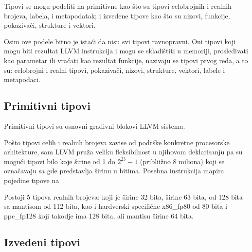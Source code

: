 Tipovi se mogu podeliti na primitivne kao što su tipovi celobrojnih i realnih brojeva, labela, i metapodatak; 
i izvedene tipove kao što su nizovi, funkcije, pokazivači, strukture i vektori.

Osim ove podele bitno je istaći da nisu svi tipovi ravnopravni.
Oni tipovi koji mogu biti rezultat LLVM instrukcija i mogu se skladištiti u memoriji, prosleđivati kao parametar ili vraćati kao rezultat funkcije, nazivaju se tipovi prvog reda, a to su: celobrojni i realni tipovi, pokazivači, nizovi, strukture, vektori, labele i metapodaci.


\subsection*{Primitivni tipovi}

Primitivni tipovi su osnovni gradivni blokovi LLVM sistema.

Pošto tipovi celih i realnih brojeva zavise od podrške konkretne procesorske arhitekture,
sam LLVM pruža veliku fleksibilnost u njihovom deklarisanju
pa su mogući tipovi bilo koje širine od 1 do $2^{23} - 1$ (pribliižno 8 miliona) koji se označavaju sa  gde  predstavlja širinu u bitima. Posebna instrukcija mapira pojedine tipove na 

Postoji 5 tipova realnih brojeva: 
 koji je širine 32 bita, 
 širine 63 bita, 
 od 128 bita sa mantisom od 112 bita, 
kao i hardverski specifične x86_fp80 od 80 bita 
i ppc_fp128 koji takodje ima 128 bita, ali mantisu širine 64 bita.


\subsection*{Izvedeni tipovi}






